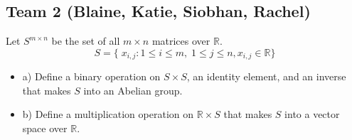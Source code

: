 \subsection*{Team 2 (Blaine, Katie, Siobhan, Rachel)} 
\par\vspace{0.3 cm}
\begin{problem*}
Let $S^{m\times n}$ be the set of all $m\times n$ matrices over $\mathbb{R}$. 
\[
S=\{\;x_{i,j} : 1\leq i\leq m,\;1\leq j\leq n, x_{i,j}\in\mathbb{R}\}
\]  
\end{problem*}
\par\vspace{0.3 cm} 
\begin{itemize}
\item a) Define a binary operation on $S\times S$, an identity element, and an inverse that makes $S$ into an Abelian group.
\item b) Define a multiplication operation on $\mathbb{R}\times S$ that makes $S$ into a vector space over $\mathbb{R}$.
\end{itemize}

